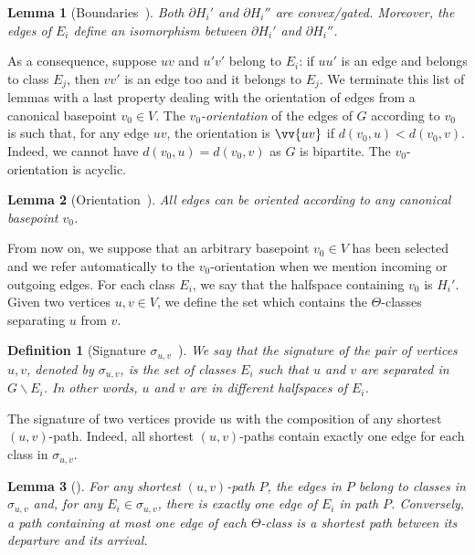 \documentclass[11pt,letterpaper]{article}
\newtheorem{lemma}{Lemma}
\newtheorem{definition}{Definition}
\begin{document}
\begin{lemma}[Boundaries~\cite{BeChChVa20,HaImKl99,Mu80}]
Both $\partial H_i'$ and $\partial H_i''$ are convex/gated. Moreover, the edges of $E_i$ define an isomorphism between $\partial H_i'$ and $\partial H_i''$.
\label{le:boundaries}
\end{lemma}


As a consequence, suppose $uv$ and $u'v'$ belong to $E_i$: if $uu'$ is an edge and belongs to class $E_j$, then $vv'$ is an edge too and it belongs to $E_j$. We terminate this list of lemmas with a last property dealing with the orientation of edges  from a canonical basepoint $v_0 \in V$. The \textit{$v_0$-orientation} of the edges of $G$ according to $v_0$ is such that, for any edge $uv$, the orientation is $\vv{uv}$ if $d(v_0,u) < d(v_0,v)$. Indeed, we cannot have $d(v_0,u) = d(v_0,v)$ as $G$ is bipartite. The $v_0$-orientation is acyclic.

\begin{lemma}[Orientation~\cite{BeChChVa20}]
All edges can be oriented according to any canonical basepoint $v_0$.
\end{lemma}

From now on, we suppose that an arbitrary basepoint $v_0 \in V$ has been selected and we refer automatically to the $v_0$-orientation when we mention incoming or outgoing edges.
For each class $E_i$, we say that the halfspace containing $v_0$ is $H_i'$.
Given two vertices $u,v \in V$, we define the set which contains the $\Theta$-classes separating $u$ from $v$.

\begin{definition}[Signature $\sigma_{u,v}$~\cite{BeDuHa22}]
We say that the {\em signature} of the pair of vertices $u,v$, denoted by $\sigma_{u,v}$, is the set of classes $E_i$ such that $u$ and $v$ are separated in $G\backslash E_i$. In other words, $u$ and $v$ are in different halfspaces of $E_i$.
\label{def:signature}
\end{definition}

The signature of two vertices provide us with the composition of any shortest $(u,v)$-path. Indeed, all shortest $(u,v)$-paths contain exactly one edge for each class in $\sigma_{u,v}$.

\begin{lemma}[\cite{BeHa21}]
For any shortest $(u,v)$-path $P$, the edges in $P$ belong to classes in $\sigma_{u,v}$ and, for any $E_i \in \sigma_{u,v}$, there is exactly one edge of $E_i$ in path $P$. Conversely, a path containing at most one edge of each $\Theta$-class is a shortest path between its departure and its arrival.
\label{le:signature}
\end{lemma}
\end{document}
